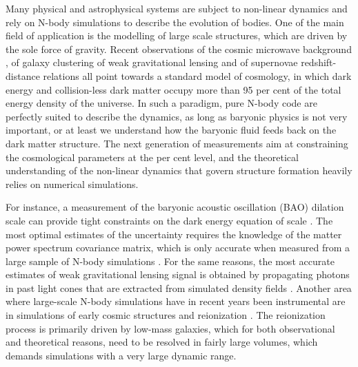 \documentclass[useAMS,usenatbib]{mn2e}
\begin{document}
Many physical and astrophysical systems are subject to non-linear dynamics
and rely on N-body simulations to describe the evolution of bodies. 
One of the main field of application is the modelling of large scale structures, 
which are driven by the sole force of gravity. Recent observations of the 
cosmic microwave background \citep{2009ApJS..180..330K,2011ApJS..192...18K}, of galaxy clustering 
\citep{2000AJ....120.1579Y, 2003astro.ph..6581C, 2009arXiv0902.4680S, 
2010MNRAS.401.1429D} of weak gravitational lensing \citep{2012AAS...21913001H, 2009ApJ...703.2232S}
and of supernovae redshift-distance relations all point towards a standard 
model of cosmology, in which dark energy and collision-less dark matter occupy 
more than 95 per cent of the total energy density of the universe. In such a 
paradigm, pure N-body code are perfectly suited to describe the dynamics, as 
long as baryonic physics is not very important, or at least we understand how 
the baryonic fluid feeds back on the dark matter structure. The next generation 
of measurements aim at constraining the cosmological parameters at the per cent 
level, and the theoretical understanding of the non-linear dynamics that govern 
structure formation heavily relies on numerical simulations. 

For instance, a measurement of the baryonic acoustic oscillation (BAO) dilation 
scale can provide tight constraints on the dark energy equation of scale 
\citep{Eisenstein:2005su,2006PhRvD..74l3507T, 2007MNRAS.381.1053P,2009arXiv0902.4680S}. 
The most optimal estimates of the uncertainty requires the 
knowledge of the matter power spectrum covariance matrix, which is only accurate 
when measured from a large sample of N-body simulations \citep{2005MNRAS.360L..82R, 
2009ApJ...700..479T, 2011ApJ...726....7T}. For the same reasons, the most accurate 
estimates of weak gravitational lensing signal is obtained by propagating photons 
in past light cones that are extracted from simulated density fields 
\citep{2003ApJ...592..699V, 2009ApJ...701..945S, 2009A&A...499...31H}.
Another area where large-scale N-body simulations have in recent years been 
instrumental are in simulations of early cosmic structures and reionization 
\citep[e.g.][]{2006MNRAS.369.1625I,2007ApJ...654...12Z,2007ApJ...671....1T,
2011arXiv1107.4772I}. The reionization process is primarily driven by low-mass 
galaxies, which for both observational and theoretical reasons, need to be resolved 
in fairly large volumes, which demands simulations with a very large dynamic range.   
\end{document}
